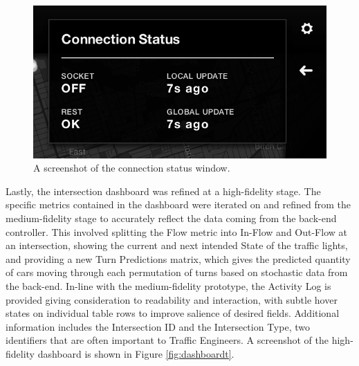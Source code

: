 \documentclass{report}
\begin{document}
\begin{figure}[htbp!]
  \begin{centering}
    \includegraphics[scale=0.6]{figures/connection.png}
    \caption{A screenshot of the connection status window.}
    \label{fig:connection}
  \end{centering}
\end{figure}

Lastly, the intersection dashboard was refined at a high-fidelity stage.
The specific metrics contained in the dashboard were iterated on and refined from the medium-fidelity stage to accurately reflect the data coming from the back-end controller.
This involved splitting the Flow metric into In-Flow and Out-Flow at an intersection, showing the current and next intended State of the traffic lights, and providing a new Turn Predictions matrix, which gives the predicted quantity of cars moving through each permutation of turns based on stochastic data from the back-end.
In-line with the medium-fidelity prototype, the Activity Log is provided giving consideration to readability and interaction, with subtle hover states on individual table rows to improve salience of desired fields.
Additional information includes the Intersection ID and the Intersection Type, two identifiers that are often important to Traffic Engineers.
A screenshot of the high-fidelity dashboard is shown in Figure \ref{fig:dashboardt}. \\
\end{document}
